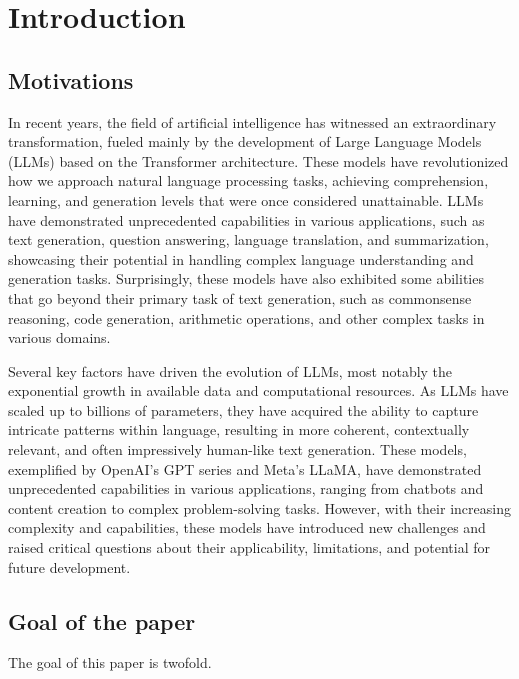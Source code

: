 

\section{Introduction}

\subsection{Motivations}

In recent years, the field of artificial intelligence has witnessed an extraordinary transformation, fueled mainly by the development of Large Language Models (LLMs) based on the Transformer architecture.
These models have revolutionized how we approach natural language processing tasks, achieving comprehension, learning, and generation levels that were once considered unattainable.
LLMs have demonstrated unprecedented capabilities in various applications, such as text generation, question answering, language translation, and summarization, showcasing their potential in handling complex language understanding and generation tasks.
Surprisingly, these models have also exhibited some abilities that go beyond their primary task of text generation, such as commonsense reasoning, code generation, arithmetic operations, and other complex tasks in various domains.

Several key factors have driven the evolution of LLMs, most notably the exponential growth in available data and computational resources.
As LLMs have scaled up to billions of parameters, they have acquired the ability to capture intricate patterns within language, resulting in more coherent, contextually relevant, and often impressively human-like text generation.
These models, exemplified by OpenAI's GPT series and Meta's LLaMA, have demonstrated unprecedented capabilities in various applications, ranging from chatbots and content creation to complex problem-solving tasks.
However, with their increasing complexity and capabilities, these models have introduced new challenges and raised critical questions about their applicability, limitations, and potential for future development.

\subsection{Goal of the paper}

The goal of this paper is twofold.

